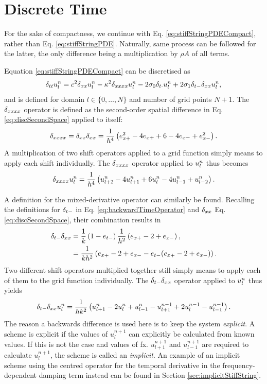 \section{Discrete Time}\label{sec:stiffStringDiscrete}
For the sake of compactness, we continue with Eq. \eqref{eq:stiffStringPDECompact}, rather than Eq. \eqref{eq:stiffStringPDE}. Naturally, same process can be followed for the latter, the only difference being a multiplication by $\rho A$ of all terms.

Equation \eqref{eq:stiffStringPDECompact} can be discretised as 
\begin{equation}\label{eq:stiffStringFDS}
    \delta_{tt} u_l^n = c^2 \delta_{xx} u_l^n - \kappa^2 \delta_{xxxx} u_l^n - 2 \sigma_{0} \delta_{t\cdot} u_l^n + 2 \sigma_{1}\delta_{t-}\delta_{xx} u_l^n,
\end{equation}
and is defined for domain $l\in\{0, \hdots, N\}$ and number of grid points $N+1$. 
The $\delta_{xxxx}$ operator is defined as the second-order spatial difference in Eq. \eqref{eq:discSecondSpace} applied to itself:
\begin{equation}\label{eq:dxxxx}
    \delta_{xxxx} = \delta_{xx}\delta_{xx} = \frac{1}{h^4}\left(e_{x+}^2 - 4e_{x+}+6 - 4e_{x-}+e_{x-}^2\right).
\end{equation} 
A multiplication of two shift operators applied to a grid function simply means to apply each shift individually. The $\delta_{xxxx}$ operator applied to $u_l^n$ thus becomes
\begin{equation}
    \delta_{xxxx}u_l^n = \frac{1}{h^4}\left(u_{l+2}^n - 4u_{l+1}^n+6u_l^n - 4u_{l-1}^n+u_{l-2}^n\right).
\end{equation}

A definition for the mixed-derivative operator can similarly be found.
Recalling the definitions for $\delta_{t-}$ in Eq. \eqref{eq:backwardTimeOperator} and $\delta_{xx}$ Eq. \eqref{eq:discSecondSpace}, their combination results in
\begin{align}
    \delta_{t-}\delta_{xx} &= \frac{1}{k}\left(1-e_{t-}\right)\frac{1}{h^2}\left(e_{x+}-2+e_{x-}\right),\nonumber \\
    &= \frac{1}{kh^2}\left(e_{x+}-2+e_{x-} - e_{t-}(e_{x+}-2+e_{x-})\right).
\end{align}
Two different shift operators multiplied together still simply means to apply each of them to the grid function individually. The $\delta_{t-}\delta_{xx}$ operator applied to $u_l^n$ thus yields
\begin{equation}
    \delta_{t-} \delta_{xx} u_l^n = \frac{1}{hk^2}\left(u_{l+1}^n - 2 u_l^n + u_{l-1}^n - u_{l+1}^{n-1} + 2 u_l^{n-1} - u_{l-1}^{n-1}\right).
\end{equation}
The reason a backwards difference is used here is to keep the system \textit{explicit}. A scheme is explicit if the values of $u_l^{n+1}$ can explicitly be calculated from known values. If this is not the case and values of fx. $u_{l+1}^{n+1}$ and $u_{l-1}^{n+1}$ are required to calculate $u_l^{n+1}$, the scheme is called an \textit{implicit}. An example of an implicit scheme using the centred operator for the temporal derivative in the frequency-dependent damping term instead can be found in Section \ref{sec:implicitStiffString}.

